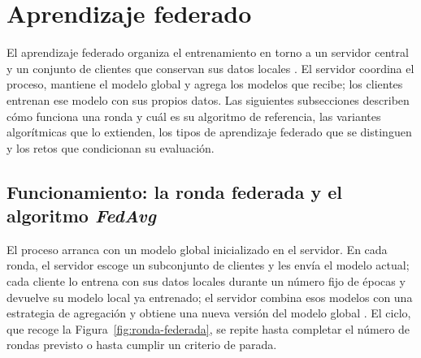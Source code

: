 \section{Aprendizaje federado}\label{sec:fl}

El aprendizaje federado organiza el entrenamiento en torno a un servidor central y un
conjunto de clientes que conservan sus datos locales \parencite{mcmahan2017communication}.
El servidor coordina el proceso, mantiene el modelo global y agrega los modelos que
recibe; los clientes entrenan ese modelo con sus propios datos. Las siguientes
subsecciones describen cómo funciona una ronda y cuál es su algoritmo de referencia, las
variantes algorítmicas que lo extienden, los tipos de aprendizaje federado que se
distinguen y los retos que condicionan su evaluación.

\subsection{Funcionamiento: la ronda federada y el algoritmo \textit{FedAvg}}\label{sec:ronda}

El proceso arranca con un modelo global inicializado en el servidor. En cada ronda, el
servidor escoge un subconjunto de clientes y les envía el modelo actual; cada cliente lo
entrena con sus datos locales durante un número fijo de épocas y devuelve su modelo local
ya entrenado; el servidor combina esos modelos con una estrategia de agregación y obtiene
una nueva versión del modelo global \parencite{mcmahan2017communication}. El ciclo, que
recoge la Figura~\ref{fig:ronda-federada}, se repite hasta completar el número de rondas
previsto o hasta cumplir un criterio de parada.


